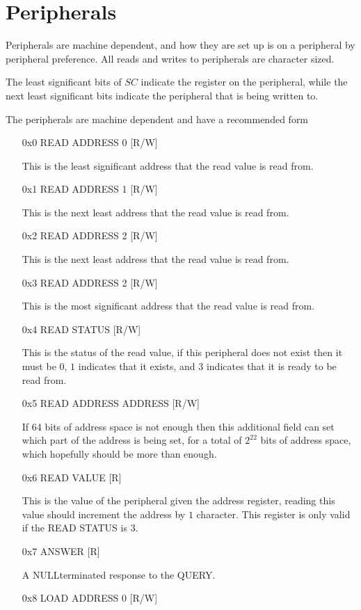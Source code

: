 \documentclass[12pt,letterpaper]{report}
\newcommand{\nil}{NULL}
\newcommand{\ronly}{[R]}
\newcommand{\rw}{[R/W]}
\begin{document}
\chapter{Peripherals}
Peripherals are machine dependent, and how they are set up is on a peripheral by peripheral preference. All reads and writes to peripherals are character sized.

The least significant bits of $SC$ indicate the register on the peripheral, while the next least significant bits indicate the peripheral that is being written to.

The peripherals are machine dependent and have a recommended form
\begin{enumerate}
\item[0x0] READ ADDRESS 0 \rw

This is the least significant address that the read value is read from.
\item[0x1] READ ADDRESS 1 \rw

This is the next least address that the read value is read from.
\item[0x2] READ ADDRESS 2 \rw

This is the next least address that the read value is read from.
\item[0x3] READ ADDRESS 2 \rw

This is the most significant address that the read value is read from.
\item[0x4] READ STATUS \rw

This is the status of the read value, if this peripheral does not exist then it must be $0$, $1$ indicates that it exists, and $3$ indicates that it is ready to be read from.
\item[0x5] READ ADDRESS ADDRESS \rw

If 64 bits of address space is not enough then this additional field can set which part of the address is being set, for a total of 
$2^{22}$ bits of address space, which hopefully should be more than enough.
\item[0x6] READ VALUE \ronly

This is the value of the peripheral given the address register, reading this value should increment the address by $1$ character. This register is only valid if the READ STATUS is $3$.

\item[0x7] ANSWER \ronly

A \nil terminated response to the QUERY.

\item[0x8] LOAD ADDRESS 0 \rw


\end{enumerate}
\end{document}
